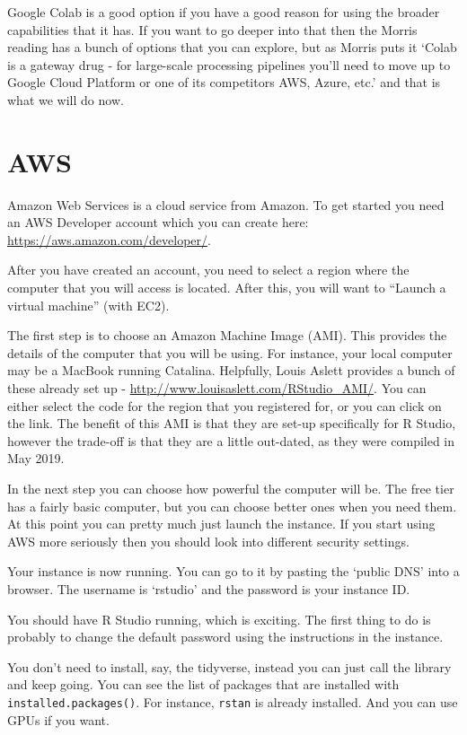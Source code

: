 \documentclass[
]{book}
\begin{document}
Google Colab is a good option if you have a good reason for using the broader capabilities that it has. If you want to go deeper into that then the Morris reading has a bunch of options that you can explore, but as Morris puts it `Colab is a gateway drug - for large-scale processing pipelines you'll need to move up to Google Cloud Platform or one of its competitors AWS, Azure, etc.' and that is what we will do now.

\hypertarget{aws}{%
\section{AWS}\label{aws}}

Amazon Web Services is a cloud service from Amazon. To get started you need an AWS Developer account which you can create here: \url{https://aws.amazon.com/developer/}.

After you have created an account, you need to select a region where the computer that you will access is located. After this, you will want to ``Launch a virtual machine'' (with EC2).

The first step is to choose an Amazon Machine Image (AMI). This provides the details of the computer that you will be using. For instance, your local computer may be a MacBook running Catalina. Helpfully, Louis Aslett provides a bunch of these already set up - \url{http://www.louisaslett.com/RStudio_AMI/}. You can either select the code for the region that you registered for, or you can click on the link. The benefit of this AMI is that they are set-up specifically for R Studio, however the trade-off is that they are a little out-dated, as they were compiled in May 2019.

In the next step you can choose how powerful the computer will be. The free tier has a fairly basic computer, but you can choose better ones when you need them. At this point you can pretty much just launch the instance. If you start using AWS more seriously then you should look into different security settings.

Your instance is now running. You can go to it by pasting the `public DNS' into a browser. The username is `rstudio' and the password is your instance ID.

You should have R Studio running, which is exciting. The first thing to do is probably to change the default password using the instructions in the instance.

You don't need to install, say, the tidyverse, instead you can just call the library and keep going. You can see the list of packages that are installed with \texttt{installed.packages()}. For instance, \texttt{rstan} is already installed. And you can use GPUs if you want.
\end{document}
